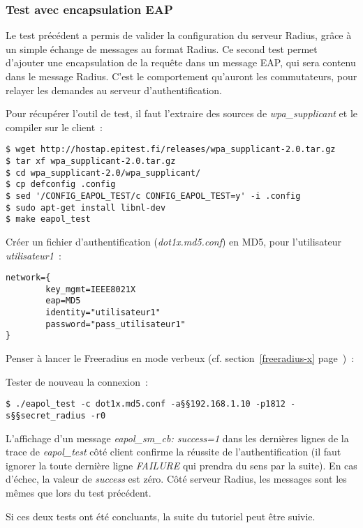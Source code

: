 \subsubsection{Test avec encapsulation EAP}

Le test précédent a permis de valider la configuration du serveur Radius, grâce à un simple échange de messages au format Radius. Ce second test permet d'ajouter une encapsulation de la requête dans un message EAP, qui sera contenu dans le message Radius. C'est le comportement qu'auront les commutateurs, pour relayer les demandes au serveur d'authentification.

\label{eapol-test}
Pour récupérer l'outil de test, il faut l'extraire des sources de \emph{wpa\_supplicant} et le compiler sur le client~:

\begin{lstlisting}
$ wget http://hostap.epitest.fi/releases/wpa_supplicant-2.0.tar.gz
$ tar xf wpa_supplicant-2.0.tar.gz
$ cd wpa_supplicant-2.0/wpa_supplicant/
$ cp defconfig .config
$ sed '/CONFIG_EAPOL_TEST/c CONFIG_EAPOL_TEST=y' -i .config
$ sudo apt-get install libnl-dev
$ make eapol_test
\end{lstlisting}

\label{auth-md5}
Créer un fichier d'authentification (\emph{dot1x.md5.conf}) en MD5, pour l'utilisateur \emph{utilisateur1}~:

\begin{lstlisting}
network={
        key_mgmt=IEEE8021X
        eap=MD5
        identity="utilisateur1"
        password="pass_utilisateur1"
}
\end{lstlisting}

Penser à lancer le Freeradius en mode verbeux (cf. section~\ref{freeradius-x} page~\pageref{freeradius-x})~:

Tester de nouveau la connexion~:

\begin{lstlisting}
$ ./eapol_test -c dot1x.md5.conf -a§§192.168.1.10 -p1812 -s§§secret_radius -r0
\end{lstlisting} 

L'affichage d'un message \og{}\emph{eapol\_sm\_cb: success=1}\fg{} dans les dernières lignes de la trace de \emph{eapol\_test} côté client confirme la réussite de l'authentification (il faut ignorer la toute dernière ligne \emph{FAILURE} qui prendra du sens par la suite). En cas d'échec, la valeur de \emph{success} est zéro. Côté serveur Radius, les messages sont les mêmes que lors du test précédent.

Si ces deux tests ont été concluants, la suite du tutoriel peut être suivie.
